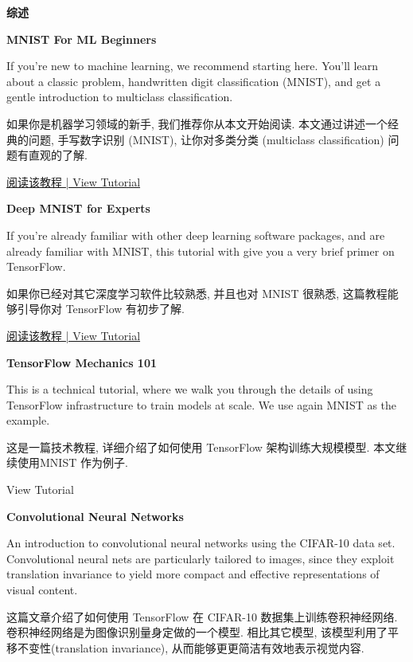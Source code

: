 



\textbf{综述}

\textbf{MNIST For ML Beginners}

If you're new to machine learning, we recommend starting here. You'll learn about a classic problem, handwritten digit classification (MNIST), and get a gentle introduction to multiclass classification.

如果你是机器学习领域的新手, 我们推荐你从本文开始阅读. 本文通过讲述一个经典的问题, 手写数字识别 (MNIST), 让你对多类分类 (multiclass classification) 问题有直观的了解.

\hyperref[MINIST_beginner]{阅读该教程 | View Tutorial}

\textbf{Deep MNIST for Experts}

If you're already familiar with other deep learning software packages, and are already familiar with MNIST, this tutorial with give you a very brief primer on TensorFlow.

如果你已经对其它深度学习软件比较熟悉, 并且也对 MNIST 很熟悉, 这篇教程能够引导你对 TensorFlow 有初步了解.



\hyperref[MINIST_pros]{阅读该教程 | View Tutorial}

\textbf{TensorFlow Mechanics 101}

This is a technical tutorial, where we walk you through the details of using TensorFlow infrastructure to train models at scale. We use again MNIST as the example.

这是一篇技术教程, 详细介绍了如何使用 TensorFlow 架构训练大规模模型. 本文继续使用MNIST 作为例子.

View Tutorial

\textbf{Convolutional Neural Networks}

An introduction to convolutional neural networks using the CIFAR-10 data set. Convolutional neural nets are particularly tailored to images, since they exploit translation invariance to yield more compact and effective representations of visual content.

这篇文章介绍了如何使用 TensorFlow 在 CIFAR-10 数据集上训练卷积神经网络. 卷积神经网络是为图像识别量身定做的一个模型. 相比其它模型, 该模型利用了平移不变性(translation invariance), 从而能够更更简洁有效地表示视觉内容.

